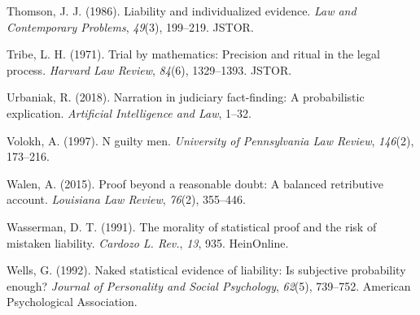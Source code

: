 \documentclass[10pt,dvipsnames,enabledeprecatedfontcommands]{scrartcl}
\begin{document}
\leavevmode\hypertarget{ref-thomson1986liability}{}%
Thomson, J. J. (1986). Liability and individualized evidence. \emph{Law
and Contemporary Problems}, \emph{49}(3), 199--219. JSTOR.

\leavevmode\hypertarget{ref-tribe1971trial}{}%
Tribe, L. H. (1971). Trial by mathematics: Precision and ritual in the
legal process. \emph{Harvard Law Review}, \emph{84}(6), 1329--1393.
JSTOR.

\leavevmode\hypertarget{ref-urbaniak2018narration}{}%
Urbaniak, R. (2018). Narration in judiciary fact-finding: A
probabilistic explication. \emph{Artificial Intelligence and Law},
1--32.

\leavevmode\hypertarget{ref-voloch1997}{}%
Volokh, A. (1997). N guilty men. \emph{University of Pennsylvania Law
Review}, \emph{146}(2), 173--216.

\leavevmode\hypertarget{ref-walen2015}{}%
Walen, A. (2015). Proof beyond a reasonable doubt: A balanced
retributive account. \emph{Louisiana Law Review}, \emph{76}(2),
355--446.

\leavevmode\hypertarget{ref-wasserman1991morality}{}%
Wasserman, D. T. (1991). The morality of statistical proof and the risk
of mistaken liability. \emph{Cardozo L. Rev.}, \emph{13}, 935.
HeinOnline.

\leavevmode\hypertarget{ref-wells1992naked}{}%
Wells, G. (1992). Naked statistical evidence of liability: Is subjective
probability enough? \emph{Journal of Personality and Social Psychology},
\emph{62}(5), 739--752. American Psychological Association.
\end{document}
